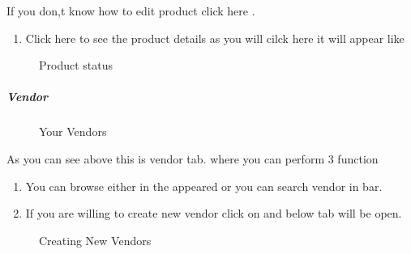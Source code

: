 \documentclass[a4paper,10pt,english]{report}
\begin{document}
If you don,t know how to edit product click here {\hyperref[\detokenize{listing:edit-product}]{}} .
\begin{enumerate}
\def\theenumi{\arabic{enumi}}
\def\labelenumi{\theenumi .}
\makeatletter\def\p@enumii{\p@enumi \theenumi .}\makeatother
\setcounter{enumi}{7}
\item {} 
Click here to see the product details as you will cilck here it will appear like

\end{enumerate}

\begin{figure}[htbp]
\centering
\capstart

\noindent{}
\caption{Product status}\label{\detokenize{prodinventory:id13}}\label{\detokenize{prodinventory:id5}}\end{figure}


\subparagraph{Vendor}
\label{\detokenize{prodinventory:vendor}}
\begin{figure}[htbp]
\centering
\capstart

\noindent{}
\caption{Your Vendors}\label{\detokenize{prodinventory:id14}}\label{\detokenize{prodinventory:id6}}\end{figure}

As you can see above this is vendor tab. where you can perform 3 function
\begin{enumerate}
\def\theenumi{\arabic{enumi}}
\def\labelenumi{\theenumi .}
\makeatletter\def\p@enumii{\p@enumi \theenumi .}\makeatother
\item {} 
You can browse  either in the appeared  or you can search vendor in  bar.

\item {} 
If you are willing to create new vendor click on  and below tab will be open.

\end{enumerate}

\begin{figure}[htbp]
\centering
\capstart

\noindent{}
\caption{Creating New Vendors}\label{\detokenize{prodinventory:id15}}\label{\detokenize{prodinventory:id7}}\end{figure}
\end{document}
